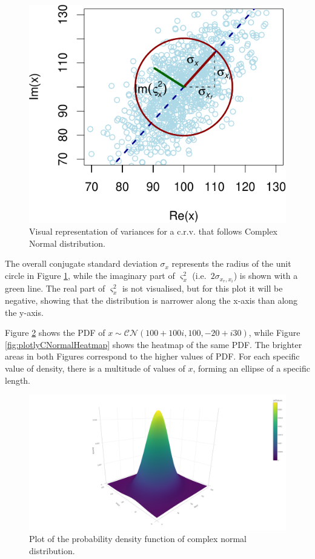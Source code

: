 \documentclass[
]{book}
\begin{document}
\begin{figure}
\centering
\includegraphics{Svetunkov---Svetunkov---Complex-Valued-Econometrics_files/figure-latex/crvNormalMoments-1.pdf}
\caption{\label{fig:crvNormalMoments}Visual representation of variances for a c.r.v. that follows Complex Normal distribution.}
\end{figure}

The overall conjugate standard deviation \(\sigma_x\) represents the radius of the unit circle in Figure \ref{fig:crvNormalMoments}, while the imaginary part of \(\varsigma_x^2\) (i.e.~\(2 \sigma_{x_r, x_i}\)) is shown with a green line. The real part of \(\varsigma_x^2\) is not visualised, but for this plot it will be negative, showing that the distribution is narrower along the x-axis than along the y-axis.

Figure \ref{fig:plotlyCNormal} shows the PDF of \(x \sim \mathcal{CN}(100+100i,100,-20+i30)\), while Figure \ref{fig:plotlyCNormalHeatmap} shows the heatmap of the same PDF. The brighter areas in both Figures correspond to the higher values of PDF. For each specific value of density, there is a multitude of values of \(x\), forming an ellipse of a specific length.

\begin{figure}
\centering
\includegraphics{./images/plotlyCNormal.png}
\caption{\label{fig:plotlyCNormal}Plot of the probability density function of complex normal distribution.}
\end{figure}
\end{document}
